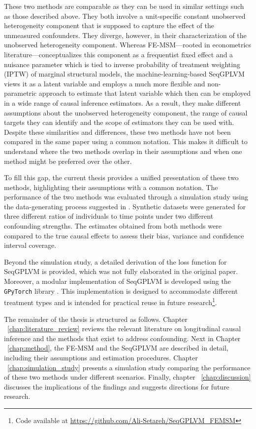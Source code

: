 These two methods are comparable as they can be used in similar settings such as those described above. They both involve a 
unit-specific constant unobserved heterogeneity component that is supposed to 
capture the effect of the unmeasured confounders. They diverge, however, 
in their characterization of the unobserved heterogeneity component. 
Whereas FE-MSM---rooted in econometrics literature---conceptualizes this component 
as a frequentist fixed effect and a nuisance parameter which is tied to inverse 
probability of treatment weighting (IPTW) of marginal structural models, 
the machine-learning-based SeqGPLVM views it as a 
latent variable and employs a much more flexible and non-parametric approach to 
estimate that latent variable which then can be employed in a wide range of 
causal inference estimators. As a result, they make different assumptions 
about the unobserved heterogeneity component, the range of causal targets they can 
identify and the scope of estimators they can be used with. Despite 
these similarities and differences, these two methods have not been 
compared in the same paper using a common notation. This makes it 
difficult to understand where the two methods overlap in their assumptions and 
when one method might be preferred over the other. 

To fill this gap, the current thesis provides a unified presentation of these two 
methods, highlighting their assumptions with a common notation. The performance of 
the two methods was evaluated through a simulation study using 
the data-generating process suggested in . 
Synthetic datasets were generated for three different ratios of individuals to time 
points under two different confounding strengths. The estimates obtained from 
both methods were compared to the true causal effects to assess their bias, 
variance and confidence interval coverage. 

Beyond the simulation study, a detailed derivation of the loss function for 
SeqGPLVM is provided, which was not fully elaborated in the original paper. 
Moreover, a modular implementation of SeqGPLVM is 
developed using the \texttt{GPyTorch} library \cite{gardnerGPyTorchBlackboxMatrixMatrix2021}. 
This implementation is designed to accommodate different treatment types and is intended for 
practical reuse in future research\footnote{Code available at \url{https://github.com/Ali-Setareh/SeqGPLVM_FEMSM}}.

The remainder of the thesis is structured as follows. Chapter ~\ref{chap:literature_review} reviews the 
relevant literature on longitudinal causal inference and the methods that exist to address confounding. Next in
Chapter ~\ref{chap:method}, the FE-MSM and the 
SeqGPLVM are described in detail, including their assumptions and estimation procedures. 
Chapter ~\ref{chap:simulation_study} presents a simulation study comparing the performance of these 
two methods under different scenarios. Finally, chapter ~\ref{chap:discussion} discusses the 
implications of the findings and suggests directions for future research.

